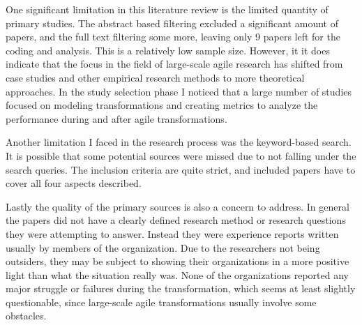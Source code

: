 One significant limitation in this literature review is the limited
quantity of primary studies. The abstract based filtering excluded a
significant amount of papers, and the full text filtering some more,
leaving only 9 papers left for the coding and analysis. This is a
relatively low sample size. However, it it does indicate that the focus
in the field of large-scale agile research has shifted from case studies
and other empirical research methods to more theoretical approaches.
In the study selection phase I noticed that a large number of studies
focused on modeling transformations and creating metrics to analyze the
performance during and after agile transformations.

Another limitation I faced in the research process was the keyword-based
search. It is possible that some potential sources were missed due to
not falling under the search queries. The inclusion criteria are quite
strict, and included papers have to cover all four aspects described.

Lastly the quality of the primary sources is also a concern to address.
In general the papers did not have a clearly defined research method or
research questions they were attempting to answer. Instead they were
experience reports written usually by members of the organization.
Due to the researchers not being outsiders, they may be subject to
showing their organizations in a more positive light than what the
situation really was. None of the organizations reported any major
struggle or failures during the transformation, which seems at least
slightly questionable, since large-scale agile transformations usually
involve some obstacles.
